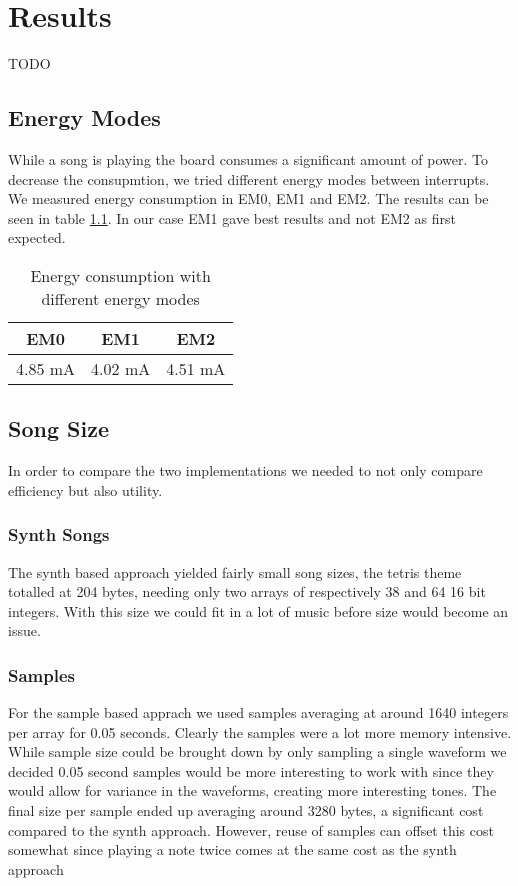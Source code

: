 \chapter{Results}
TODO

\section{Energy Modes}
\label{sec:energyModeResults}
While a song is playing the board consumes a significant amount of power. To decrease the consupmtion, we tried different energy modes between interrupts. We measured energy consumption in EM0, EM1 and EM2. The results can be seen in table \ref{tab:benchmarkEnergyModes}. In our case EM1 gave best results and not EM2 as first expected.

\begin{table}[ht]
	\begin{center}
	\begin{tabular}{ |c|c|c| }
	  \hline
	  EM0 & EM1 & EM2 \\
	  \hline
	  4.85 mA & 4.02 mA & 4.51 mA \\
	  \hline

	\end{tabular}
	\caption{Energy consumption with different energy modes}
	\label{tab:benchmarkEnergyModes}
	\end{center}
\end{table}

\section{Song Size}
In order to compare the two implementations we needed to not only compare efficiency but also utility. 

\subsection{Synth Songs}
The synth based approach yielded fairly small song sizes, the tetris theme totalled at 204 bytes, needing only two arrays of respectively 38 and 64 16 bit integers. With this size we could fit in a lot of music before size would become an issue.

\subsection{Samples}
For the sample based apprach we used samples averaging at around 1640 integers per array for 0.05 seconds. Clearly the samples were a lot more memory intensive. While sample size could be brought down by only sampling a single waveform we decided 0.05 second samples would be more interesting to work with since they would allow for variance in the waveforms, creating more interesting tones. The final size per sample ended up averaging around 3280 bytes, a significant cost compared to the synth approach. However, reuse of samples can offset this cost somewhat since playing a note twice comes at the same cost as the synth approach
